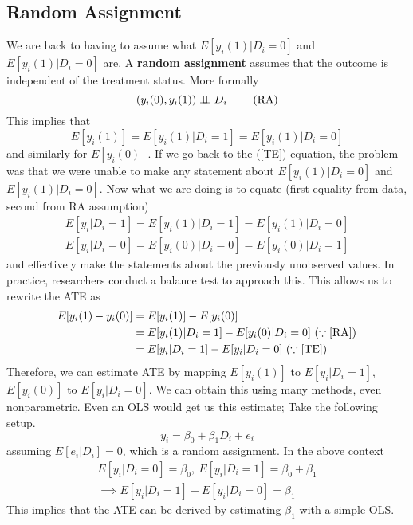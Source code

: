 \documentclass[12pt]{article}
\theoremstyle{definition}
\theoremstyle{property}
\theoremstyle{assumption}
\theoremstyle{example}
\theoremstyle{comment}
\begin{document}
\subsection{Random Assignment}
We are back to having to assume what $E[y_i(1)|D_i=0]$ and $E[y_i(1)|D_i=0]$ are. A \textbf{random assignment} assumes that the outcome is independent of the treatment status. More formally
\[
(y_i(0), y_i(1))\perp \!\!\! \perp D_i \ \tag{\text{RA}}\label{RA}
\]
This implies that
\[
E[y_i(1)]=E[y_i(1)|D_i=1]=E[y_i(1)|D_i=0]
\]
and similarly for $E[y_i(0)]$. If we go back to the (\ref{TE}) equation, the problem was that we were unable to make any statement about $E[y_i(1)|D_i=0]$ and $E[y_i(1)|D_i=0]$. Now what we are doing is to equate (first equality from data, second from RA assumption)
\begin{gather*}
E[y_i|D_i=1]=E[y_i(1)|D_i=1]=E[y_i(1)|D_i=0]\\
 E[y_i|D_i=0]=E[y_i(0)|D_i=0]=E[y_i(0)|D_i=1]
\end{gather*}
and effectively make the statements about the previously unobserved values. In practice, researchers conduct a balance test to approach this. This allows us to rewrite the ATE as 
\begin{align*}
E[y_i(1)-y_i(0)]&=E[y_i(1)]-E[y_i(0)]\\
&=E[y_i(1)|D_i=1]-E[y_i(0)|D_i=0] \ (\because \ref{RA})\\
&=E[y_i|D_i=1]-E[y_i|D_i=0] \ (\because \ref{TE})
\end{align*}
Therefore, we can estimate ATE by mapping $E[y_i(1)]$ to $E[y_i|D_i=1]$, $E[y_i(0)]$ to $E[y_i|D_i=0]$. We can obtain this using many methods, even nonparametric. Even an OLS would get us this estimate; Take the following setup.
\[
y_ i = \beta_0 + \beta_1 D_i+e_i
\]
assuming $E[e_i|D_i]=0$, which is a random assignment. 
In the above context
\begin{gather*}
E[y_i|D_i=0]=\beta_0,\  E[y_i|D_i=1]=\beta_0+\beta_1 \\
\implies E[y_i|D_i=1] - E[y_i|D_i=0] = \beta_1
\end{gather*}
This implies that the ATE can be derived by estimating $\beta_1$ with a simple OLS.
\end{document}
